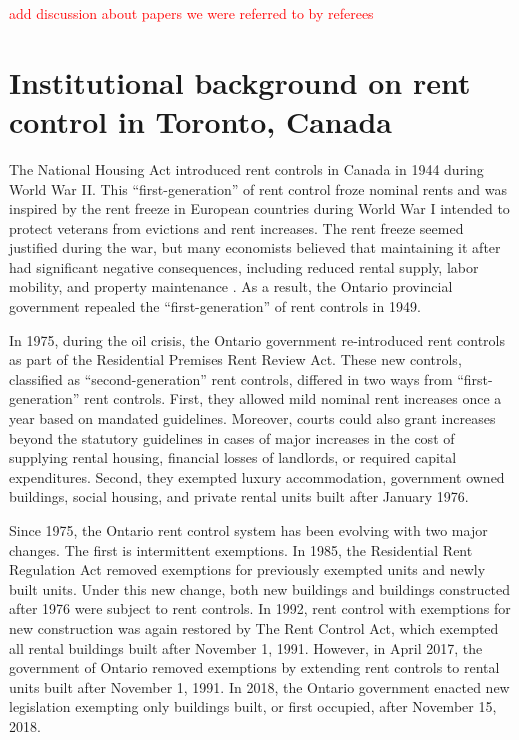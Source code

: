 \documentclass[parskip=full]{article}
\begin{document}
\textcolor{red}{add discussion about papers we were referred to by referees}

\section{Institutional background on rent control in Toronto, Canada}\label{sec:insitutional_background}
The National Housing Act introduced rent controls in Canada in 1944 during World War II. This “first-generation” of rent control froze nominal rents and was inspired by the rent freeze in European countries during World War I intended to protect veterans from evictions and rent increases. The rent freeze seemed justified during the war, but many economists believed that maintaining it after had significant negative consequences, including reduced rental supply, labor mobility, and property maintenance \citep{arnott-1995}. As a result, the Ontario provincial government repealed the “first-generation” of rent controls in 1949.  

In 1975, during the oil crisis, the Ontario government re-introduced rent controls as part of the Residential Premises Rent Review Act. These new controls, classified as “second-generation” rent controls, differed in two ways from “first-generation” rent controls. First, they allowed mild nominal rent increases once a year based on mandated guidelines. Moreover, courts could also grant increases beyond the statutory guidelines in cases of major increases in the cost of supplying rental housing, financial losses of landlords, or required capital expenditures. Second, they exempted luxury accommodation, government owned buildings, social housing, and private rental units built after January 1976.

Since 1975, the Ontario rent control system has been evolving with two major changes. The first is intermittent exemptions. In 1985, the Residential Rent Regulation Act removed exemptions for previously exempted units and newly built units. Under this new change, both new buildings and buildings constructed after 1976 were subject to rent controls. In 1992, rent control with exemptions for new construction was again restored by The Rent Control Act, which exempted all rental buildings built after November 1, 1991. However, in April 2017, the government of Ontario removed exemptions by extending rent controls to rental units built after November 1, 1991. In 2018, the Ontario government enacted new legislation exempting only buildings built, or first occupied, after November 15, 2018.
\end{document}
